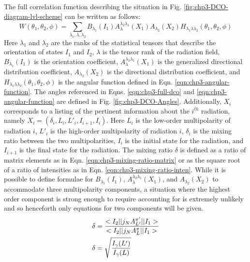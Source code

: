 The full correlation function describing the situation in Fig. \ref{fig:chp3-DCO-diagram-lvl-scheme} can be written as follows\cite{dcoKrane,emInteraction}:
\begin{equation}
\label{eqn:chp3-full-dco}
W\left(\theta{}_1,\theta{}_2,\phi{}\right) = \sum\limits_{\lambda{}_1,\lambda{},\lambda{}_2}^{} B_{\lambda{}_1}\left(I_1\right) A_{\lambda{}}^{\lambda{}_2\lambda{}_1}\left(X_1\right) A_{\lambda{}_2}\left(X_2\right) H_{\lambda{}_1\lambda{}\lambda{}_2}\left(\theta{}_1,\theta{}_2,\phi{}\right)
\end{equation}
Here $\lambda{}_1$ and $\lambda{}_2$ are the ranks of the statistical tensors that describe the orientation of states $I_1$ and $I_2$, $\lambda{}$ is the tensor rank of the radiation field, $B_{\lambda{}_1}\left(I_1\right)$ is the orientation coefficient, $A_{\lambda{}}^{\lambda{}_2\lambda{}_1}\left(X_1\right)$ is the generalized directional distribution coefficient, $A_{\lambda{}_2}\left(X_2\right)$ is the directional distribution coefficient, and $H_{\lambda{}_1\lambda{}\lambda{}_2}\left(\theta{}_1,\theta{}_2,\phi{}\right)$ is the angular function defined in Eqn. \ref{eqn:chp3-angular-function}. The angles referenced in Eqns. \ref{eqn:chp3-full-dco} and \ref{eqn:chp3-angular-function} are defined in Fig. \ref{fig:chp3-DCO-Angles}. Additionally, $X_i$ corresponds to a listing of the pertinent information about the $i^{th}$ radiation, namely $X_i = \left(\delta{}_i,L_i,L'_i,I_{i+1},I_i\right)$. Here $L_i$ is the low-order multipolarity of radiation $i$, $L'_i$ is the high-order multipolarity of radiation $i$, $\delta{}_i$ is the mixing ratio between the two multipolarities, $I_i$ is the initial state for the radiation, and $I_{i+1}$ is the final state for the radiation. The mixing ratio $\delta{}$ is defined as a ratio of matrix elements as in Eqn. \ref{eqn:chp3-mixing-ratio-matrix} or as the square root of a ratio of intensities as in Eqn. \ref{eqn:chp3-mixing-ratio-inten}. While it is possible to define formulae for $B_{\lambda{}_1}\left(I_1\right)$, $A_{\lambda{}}^{\lambda{}_2\lambda{}_1}\left(X_1\right)$, and $A_{\lambda{}_2}\left(X_2\right)$ to accommodate three multipolarity components, a situation where the highest order component is strong enough to require accounting for is extremely unlikely and so henceforth only equations for two components will be given.
\begin{align}
\delta{} &= \frac{<I_2||\boldmath{j_NA^{\pi{}'}_{L'}}||I_1>}{<I_2||\boldmath{j_NA^{\pi{}}_{L}}||I_1>} \label{eqn:chp3-mixing-ratio-matrix}\\
\delta{} &= \sqrt{\frac{I_{\gamma{}}(L')}{I_{\gamma{}}(L)}} \label{eqn:chp3-mixing-ratio-inten}
\end{align}


